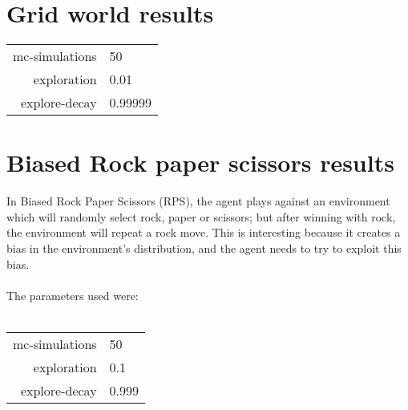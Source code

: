 \documentclass[pdftex,twoside,a4paper]{report}
\begin{document}

\section{Grid world results}


\begin{tabular}{| r | l | }
\hline
mc-simulations & 50\\
exploration & 0.01\\
explore-decay & 0.99999\\
\hline
\end{tabular}
\section{Biased Rock paper scissors results}
In Biased Rock Paper Scissors (RPS), the agent plays against an environment which will randomly select rock, paper or scissors; but after winning with rock, the environment will repeat a rock move. This is interesting because it creates a bias in the environment's distribution, and the agent needs to try to exploit this bias.\\\\
The parameters used were:\\\\
\begin{tabular}{| r | l | }
\hline
mc-simulations & 50\\
exploration & 0.1\\
explore-decay & 0.999\\
\hline
\end{tabular}
\end{document}
